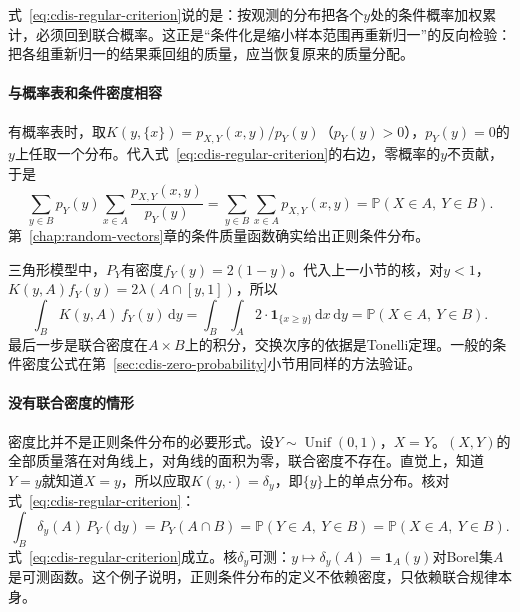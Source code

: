 式~\eqref{eq:cdis-regular-criterion}说的是：按观测的分布把各个$y$处的条件概率加权累计，必须回到联合概率。这正是“条件化是缩小样本范围再重新归一”的反向检验：把各组重新归一的结果乘回组的质量，应当恢复原来的质量分配。

\paragraph{与概率表和条件密度相容}
有概率表时，取$K(y,\{x\})=p_{X,Y}(x,y)/p_Y(y)$（$p_Y(y)>0$），$p_Y(y)=0$的$y$上任取一个分布。代入式~\eqref{eq:cdis-regular-criterion}的右边，零概率的$y$不贡献，于是
\[
 \sum_{y\in B}p_Y(y)\sum_{x\in A}\frac{p_{X,Y}(x,y)}{p_Y(y)}=\sum_{y\in B}\sum_{x\in A}p_{X,Y}(x,y)=\mathbb{P}(X\in A,\ Y\in B).
\]
第~\ref{chap:random-vectors}章的条件质量函数确实给出正则条件分布。

三角形模型中，$P_Y$有密度$f_Y(y)=2(1-y)$。代入上一小节的核，对$y<1$，$K(y,A)f_Y(y)=2\lambda(A\cap[y,1])$，所以
\[
 \int_{B}K(y,A)\,f_Y(y)\,\mathrm{d}y=\int_{B}\int_{A}2\cdot\mathbf{1}_{\{x\geq y\}}\,\mathrm{d}x\,\mathrm{d}y=\mathbb{P}(X\in A,\ Y\in B).
\]
最后一步是联合密度在$A\times B$上的积分，交换次序的依据是Tonelli定理。一般的条件密度公式在第~\ref{sec:cdis-zero-probability}小节用同样的方法验证。

\paragraph{没有联合密度的情形}
密度比并不是正则条件分布的必要形式。设$Y\sim\operatorname{Unif}(0,1)$，$X=Y$。$(X,Y)$的全部质量落在对角线上，对角线的面积为零，联合密度不存在。直觉上，知道$Y=y$就知道$X=y$，所以应取$K(y,\cdot)=\delta_y$，即$\{y\}$上的单点分布。核对式~\eqref{eq:cdis-regular-criterion}：
\[
 \int_{B}\delta_y(A)\,P_Y(\mathrm{d}y)=P_Y(A\cap B)=\mathbb{P}(Y\in A,\ Y\in B)=\mathbb{P}(X\in A,\ Y\in B).
\]
式~\eqref{eq:cdis-regular-criterion}成立。核$\delta_y$可测：$y\mapsto\delta_y(A)=\mathbf{1}_{A}(y)$对Borel集$A$是可测函数。这个例子说明，正则条件分布的定义不依赖密度，只依赖联合规律本身。

